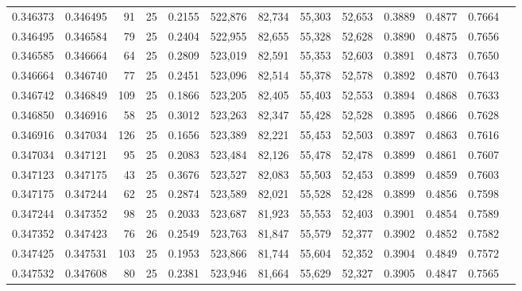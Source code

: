 \begin{tabular}{rrrrrrrrrrrrr}
0.346373 & 0.346495 &    91 &  25 &                                     0.2155 & 522,876 &  82,734 &  55,303 &  52,653 & 0.3889 & 0.4877 & 0.7664 \\
0.346495 & 0.346584 &    79 &  25 &                                     0.2404 & 522,955 &  82,655 &  55,328 &  52,628 & 0.3890 & 0.4875 & 0.7656 \\
0.346585 & 0.346664 &    64 &  25 &                                     0.2809 & 523,019 &  82,591 &  55,353 &  52,603 & 0.3891 & 0.4873 & 0.7650 \\
0.346664 & 0.346740 &    77 &  25 &                                     0.2451 & 523,096 &  82,514 &  55,378 &  52,578 & 0.3892 & 0.4870 & 0.7643 \\
0.346742 & 0.346849 &   109 &  25 &                                     0.1866 & 523,205 &  82,405 &  55,403 &  52,553 & 0.3894 & 0.4868 & 0.7633 \\
0.346850 & 0.346916 &    58 &  25 &                                     0.3012 & 523,263 &  82,347 &  55,428 &  52,528 & 0.3895 & 0.4866 & 0.7628 \\
0.346916 & 0.347034 &   126 &  25 &                                     0.1656 & 523,389 &  82,221 &  55,453 &  52,503 & 0.3897 & 0.4863 & 0.7616 \\
0.347034 & 0.347121 &    95 &  25 &                                     0.2083 & 523,484 &  82,126 &  55,478 &  52,478 & 0.3899 & 0.4861 & 0.7607 \\
0.347123 & 0.347175 &    43 &  25 &                                     0.3676 & 523,527 &  82,083 &  55,503 &  52,453 & 0.3899 & 0.4859 & 0.7603 \\
0.347175 & 0.347244 &    62 &  25 &                                     0.2874 & 523,589 &  82,021 &  55,528 &  52,428 & 0.3899 & 0.4856 & 0.7598 \\
0.347244 & 0.347352 &    98 &  25 &                                     0.2033 & 523,687 &  81,923 &  55,553 &  52,403 & 0.3901 & 0.4854 & 0.7589 \\
0.347352 & 0.347423 &    76 &  26 &                                     0.2549 & 523,763 &  81,847 &  55,579 &  52,377 & 0.3902 & 0.4852 & 0.7582 \\
0.347425 & 0.347531 &   103 &  25 &                                     0.1953 & 523,866 &  81,744 &  55,604 &  52,352 & 0.3904 & 0.4849 & 0.7572 \\
0.347532 & 0.347608 &    80 &  25 &                                     0.2381 & 523,946 &  81,664 &  55,629 &  52,327 & 0.3905 & 0.4847 & 0.7565 \\

\end{tabular}
